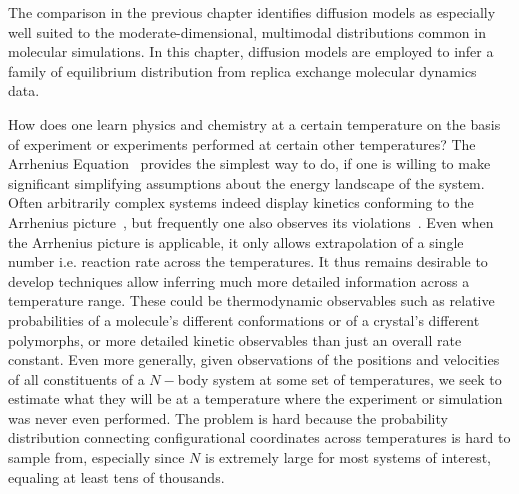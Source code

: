 

The comparison in the previous chapter identifies diffusion models as especially well suited to the moderate-dimensional, multimodal distributions common in molecular simulations. In this chapter, diffusion models are employed to infer a family of equilibrium distribution from replica exchange molecular dynamics data.

How  does  one  learn  physics  and  chemistry at  a  certain  temperature  on  the  basis  of  experiment  or  experiments  performed  at  certain  other  temperatures? The Arrhenius  Equation~\cite{laidler1984development} provides the  simplest  way  to  do,  if  one  is  willing  to make significant simplifying assumptions about the energy landscape  of  the  system. Often arbitrarily complex systems indeed display kinetics conforming to the Arrhenius picture~\cite{scalley1997protein}, but frequently one also observes its violations~\cite{chan1998protein}. Even when the Arrhenius picture is applicable, it only allows extrapolation of a single number i.e. reaction rate across the temperatures. It thus remains desirable to develop techniques allow inferring much more detailed information across a temperature range. These could be thermodynamic observables such as relative probabilities of a molecule's different conformations or of a crystal's different polymorphs, or more detailed kinetic observables than just an overall rate constant. Even more generally, given observations of the positions and velocities of all constituents of a $N-$body system at some set of temperatures, we seek to estimate what they will be at a temperature where the experiment or simulation was never even performed. The problem is hard because the probability distribution connecting configurational coordinates across temperatures is hard to sample from, especially since $N$ is extremely large for most systems of interest, equaling at least tens of thousands.

